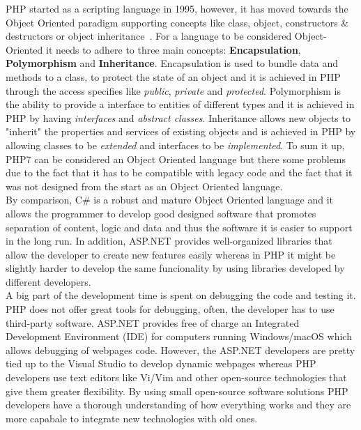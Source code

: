 \documentclass[11]{article}
\begin{document}
	\indent
	PHP started as a scripting language in 1995, however, it has moved towards the Object Oriented paradigm supporting concepts like class, object, constructors \& destructors or object inheritance~\citep{PhpOop}. For a language to be considered Object-Oriented it needs to adhere to three main concepts: \textbf{Encapsulation}, \textbf{Polymorphism} and \textbf{Inheritance}. Encapsulation is used to bundle data and methods to a class, to protect the state of an object and it is achieved in PHP through the access specifies like \textit{public}, \textit{private} and \textit{protected}. Polymorphism is the ability to provide a interface to entities of different types and it is achieved in PHP by having \textit{interfaces} and \textit{abstract classes}. Inheritance allows new objects to "inherit" the properties and services of existing objects and is achieved in PHP by allowing classes to be \textit{extended} and interfaces to be \textit{implemented}. To sum it up, PHP7 can be considered an Object Oriented language but there some problems due to the fact that it has to be compatible with legacy code and the fact that it was not designed from the start as an Object Oriented language.\\
	By comparison, C\# is a robust and mature Object Oriented language and it allows the programmer to develop good designed software that promotes separation of content, logic and data and thus the software it is easier to support in the long run. In addition, ASP.NET provides well-organized libraries that allow the developer to create new features easily  whereas in PHP it might be slightly harder to develop the same funcionality by using libraries developed by different developers. \\

	\indent
	A big part of the development time is spent on debugging the code and  testing it. PHP does not offer great tools for debugging, often, the developer has to use third-party software. ASP.NET provides free of charge an Integrated Development Environment (IDE) for computers running Windows/macOS which allows debugging of webpages code. However, the ASP.NET developers are pretty tied up to the Visual Studio to develop dynamic webpages whereas PHP developers use text editors like Vi/Vim and other open-source technologies that give them greater flexibility. By using small open-source software solutions PHP developers have a thorough understanding of how everything works and they are more capabale to integrate new technologies with old ones.\\
	
\end{document}
